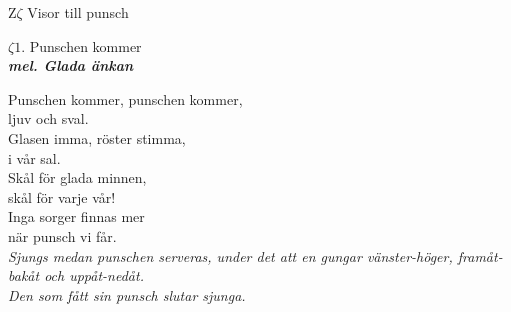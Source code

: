 \documentclass[a6paper,10pt]{article}
\newcommand{\mel}[1]{\small\textbf{\textit{mel. #1 \\}}}
\begin{document}
\noindent
\huge{Z$\zeta$ Visor till punsch}
\begin{center}
\Large $\zeta1$. Punschen kommer \\ 
\mel{Glada änkan}
\end{center}
\small Punschen kommer, punschen kommer,\\
ljuv och sval.\\
Glasen imma, röster stimma,\\
i vår sal.\\
Skål för glada minnen,\\
skål för varje vår!\\
Inga sorger finnas mer\\
när punsch vi får.
\vspace{10pt}\\
\textit{Sjungs medan punschen serveras, under det att en gungar vänster-höger, framåt-bakåt och uppåt-nedåt.
\vspace{5pt}\\
Den som fått sin punsch slutar sjunga.}
\end{document}
